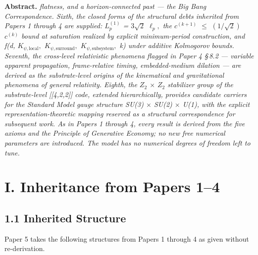 \documentclass[11pt,oneside]{report}
\theoremstyle{definition}
\theoremstyle{remark}
\newenvironment{paperabstract}
  {\begin{center}\begin{minipage}{0.88\textwidth}\small
   \noindent\textbf{Abstract.}\itshape\space}
  {\end{minipage}\end{center}\vspace{0.4em}}
\begin{document}
\begin{paperabstract}
flatness, and a horizon-connected past --- the Big Bang Correspondence.
Sixth, the closed forms of the structural debts inherited from Papers 1
through 4 are supplied: \ensuremath{L_{p}^{(1)}} = \ensuremath{3\sqrt{2}} \ensuremath{\ell_{p},} the \ensuremath{c^{(k+1)}} \ensuremath{\leq} \ensuremath{(1/\sqrt{2})}
\ensuremath{c^{(k)}} bound at saturation realized by explicit minimum-period
construction, and f(d, \ensuremath{K_{\psi,\mathrm{local}},} \ensuremath{K_{\psi,\mathrm{surround}},} \ensuremath{K_{\psi,\mathrm{subsystem}},} k)
under additive Kolmogorov bounds. Seventh, the cross-level relativistic
phenomena flagged in Paper 4 \S\,8.2 --- variable apparent propagation,
frame-relative timing, embedded-medium dilation --- are derived as the
substrate-level origins of the kinematical and gravitational phenomena
of general relativity. Eighth, the \ensuremath{Z_{2}} \ensuremath{\times} \ensuremath{Z_{2}} stabilizer group of the
substrate-level [[4,2,2]] code, extended hierarchically,
provides candidate carriers for the Standard Model gauge structure SU(3)
\ensuremath{\times} SU(2) \ensuremath{\times} U(1), with the explicit representation-theoretic mapping
reserved as a structural correspondence for subsequent work. As in
Papers 1 through 4, every result is derived from the five axioms and the
Principle of Generative Economy; no new free numerical parameters are
introduced. The model has no numerical degrees of freedom left to tune.
\end{paperabstract}

\section*{I. Inheritance from Papers 1--4}

\subsection*{1.1 Inherited Structure}

Paper 5 takes the following structures from Papers 1 through 4 as given
without re-derivation.
\end{document}
